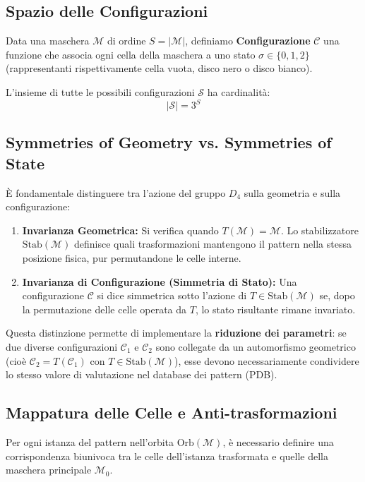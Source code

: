 \subsection{Spazio delle Configurazioni}
Data una maschera $\mathcal{M}$ di ordine $S = |\mathcal{M}|$, definiamo \textbf{Configurazione} $\mathcal{C}$ una funzione che associa ogni cella della maschera a uno stato $\sigma \in \{0, 1, 2\}$ (rappresentanti rispettivamente cella vuota, disco nero o disco bianco).

L'insieme di tutte le possibili configurazioni $\mathcal{S}$ ha cardinalità:
\begin{equation}
    |\mathcal{S}| = 3^S
\end{equation}

\subsection{Symmetries of Geometry vs. Symmetries of State}
È fondamentale distinguere tra l'azione del gruppo $D_4$ sulla geometria e sulla configurazione:
\begin{enumerate}
    \item \textbf{Invarianza Geometrica:} Si verifica quando $T(\mathcal{M}) = \mathcal{M}$. Lo stabilizzatore $\text{Stab}(\mathcal{M})$ definisce quali trasformazioni mantengono il pattern nella stessa posizione fisica, pur permutandone le celle interne.
    \item \textbf{Invarianza di Configurazione (Simmetria di Stato):} Una configurazione $\mathcal{C}$ si dice simmetrica sotto l'azione di $T \in \text{Stab}(\mathcal{M})$ se, dopo la permutazione delle celle operata da $T$, lo stato risultante rimane invariato.
\end{enumerate}

Questa distinzione permette di implementare la \textbf{riduzione dei parametri}: se due diverse configurazioni $\mathcal{C}_1$ e $\mathcal{C}_2$ sono collegate da un automorfismo geometrico (cioè $\mathcal{C}_2 = T(\mathcal{C}_1)$ con $T \in \text{Stab}(\mathcal{M})$), esse devono necessariamente condividere lo stesso valore di valutazione nel database dei pattern (PDB).

\subsection{Mappatura delle Celle e Anti-trasformazioni}

Per ogni istanza del pattern nell'orbita $\text{Orb}(\mathcal{M})$, è necessario definire una corrispondenza biunivoca tra le celle dell'istanza trasformata e quelle della maschera principale $\mathcal{M}_0$.


